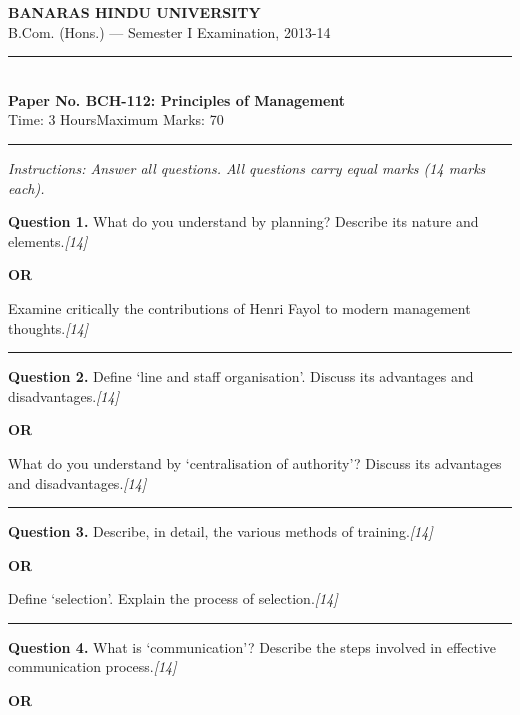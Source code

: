\documentclass[11pt,a4paper]{article}
\newcommand{\pts}[1]{\hfill   \textit{[#1]}}
\begin{document}
\begin{center}
  {\large\bfseries BANARAS HINDU UNIVERSITY}\\[2pt]
  {\normalsize B.Com. (Hons.) --- Semester I Examination, 2013-14}\\[6pt]
  \rule{0.8\linewidth}{0.5pt}\\[6pt]
  {\large\bfseries Paper No. BCH-112: Principles of Management}\\[4pt]
  {\normalsize Time: 3 Hours\hfill Maximum Marks: 70}
\end{center}

\rule{\linewidth}{0.4pt}

\smallskip



\noindent   \textit{Instructions: Answer all questions. All questions carry equal marks (14 marks each).}

\bigskip




\noindent   \textbf{Question 1.}
What do you understand by planning? Describe its nature and elements.\pts{14}

\centerline{   \textbf{OR}}

Examine critically the contributions of Henri Fayol to modern management thoughts.\pts{14}

\medskip\rule{\linewidth}{0.2pt}




\noindent   \textbf{Question 2.}
Define `line and staff organisation'. Discuss its advantages and disadvantages.\pts{14}

\centerline{   \textbf{OR}}

What do you understand by `centralisation of authority'? Discuss its advantages and disadvantages.\pts{14}

\medskip\rule{\linewidth}{0.2pt}




\noindent   \textbf{Question 3.}
Describe, in detail, the various methods of training.\pts{14}

\centerline{   \textbf{OR}}

Define `selection'. Explain the process of selection.\pts{14}

\medskip\rule{\linewidth}{0.2pt}




\noindent   \textbf{Question 4.}
What is `communication'? Describe the steps involved in effective communication process.\pts{14}

\centerline{   \textbf{OR}}
\end{document}
